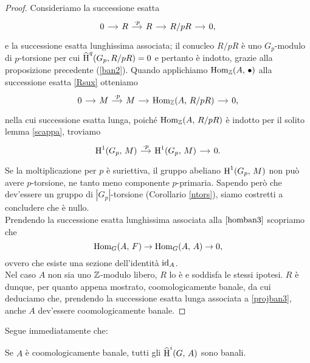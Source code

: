 \begin{proof}
	Consideriamo la successione esatta
	\begin{equation}\label{Rsux}
		\begin{tikzcd}[column sep = small]
		0 \rar & R \rar["\cdot p"] & R \rar & R/pR \rar & 0,
		\end{tikzcd}
	\end{equation}
	e la successione esatta lunghissima associata; il conucleo $ R/pR $ è uno $ G_p $-modulo di $ p $-torsione per cui $ \operatorname{\widehat{H}}^{q}(G_p, R/pR) = 0 $ e pertanto è indotto, grazie alla proposizione precedente (\ref{ban2}). Quando applichiamo $ \operatorname{Hom}_{\mathbb{Z}}(A, \, \bullet) $ alla successione esatta \ref{Rsux} otteniamo
	\begin{equation*}
		\begin{tikzcd}[column sep = small]
		0 \rar & M \rar["\cdot p"] & M \rar & \Hom_\Z(A, \, R/pR) \rar & 0,
		\end{tikzcd}
	\end{equation*}
	nella cui successione esatta lunga, poiché $ \operatorname{Hom}_{\mathbb{Z}}(A, \, R/pR) $ è indotto per il solito lemma \ref{scappa}, troviamo
	\[ \begin{tikzcd}[column sep = small]
	\HH^1(G_p, \, M) \rar["\cdot p"] & \HH^1(G_p, \, M) \rar & 0.
	\end{tikzcd}  \]
	Se la moltiplicazione per $ p $ è suriettiva, il gruppo abeliano $ \operatorname{H}^1(G_p, \, M) $ non può avere $ p $-torsione, ne tanto meno componente $ p $-primaria. Sapendo però che dev'essere un gruppo di $ |G_p | $-torsione (Corollario \ref{ntors}), siamo costretti a concludere che è nullo. \\
	
	Prendendo la successione esatta lunghissima associata alla $ \ref{homban3} $ scopriamo che
	\[ \operatorname{Hom}_G(A, \, F) \to \operatorname{Hom}_G(A, \, A) \to 0, \]
	ovvero che esiste una sezione dell'identità $ \operatorname{id}_A $.\\
	
	Nel caso $ A $ non sia uno $ \mathbb{Z} $-modulo libero, $ R $ lo è e soddisfa le stessi ipotesi. $ R $ è dunque, per quanto appena mostrato, coomologicamente banale, da cui deduciamo che, prendendo la successione esatta lunga associata a \ref{projban3}, anche $ A $ dev'essere coomologicamente banale.
	
\end{proof}

Segue immediatamente che:

\begin{corollary}
	Se $ A $ è coomologicamente banale, tutti gli $ \operatorname{\widehat{H}}^i(G, \, A) $ sono banali.
\end{corollary}

